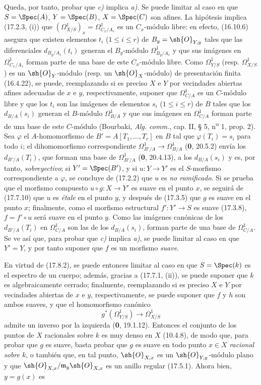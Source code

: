 Queda, por tanto, probar que \emph{c)} implica \emph{a)}. Se puede limitar al caso en que $S=\Spec(A)$, $Y=\Spec(B)$, $X=\Spec(C)$ son afines. La hipótesis implica (17.2.3, (i)) que $(\varOmega^1_{X/S})_x=\Omega^1_{C_x/A_s}$ es un $C_x$-módulo libre: en efecto, (16.10.6) asegura que existen elementos $t_i$ ($1\leq i\leq r$) de $B_y=\sh{O}_{Y,y}$ tales que las diferenciales $d_{B_y/A_s}(t_i)$ generan el $B_y$-módulo $\Omega^1_{B_y/A_s}$ y que sus imágenes en $\Omega^1_{C_x/A_s}$ forman parte de una base de este $C_x$-módulo libre. Como $\varOmega^1_{Y/S}$ (resp. $\varOmega^1_{X/S}$) es un $\sh{O}_Y$-módulo (resp. un $\sh{O}_X$-módulo) de presentación finita (16.4.22), se puede, reemplazando si es preciso $X$ e $Y$ por vecindades abiertas afines adecuadas de $x$ e $y$, respectivamente, suponer que $\Omega^1_{C/A}$ es un $C$-módulo libre y que los $t_i$ son las imágenes de elementos $s_i$ ($1\leq i\leq r$) de $B$ tales que los $d_{B/A}(s_i)$ generan el $B$-módulo $\Omega^1_{B/A}$ y que sus imágenes en $\Omega^1_{C/A}$ forman parte de una base de este $C$-módulo (Bourbaki, \emph{Alg. comm.}, cap. II, § 5, n\textsuperscript{o} 1, prop. 2). Sea $\varphi$ el $A$-homomorfismo de $B'=A[T_1,\ldots,T_r]$ en $B$ tal que $\varphi(T_i)=s_i$ para todo $i$; el dihomomorfismo correspondiente $\Omega^1_{B'/A}\to\Omega^1_{B/A}$ (\textbf 0, 20.5.2) envía los $d_{B'/A}(T_i)$, que forman una base de $\Omega^1_{B'/A}$ (\textbf 0, 20.4.13), a los $d_{B/A}(s_i)$ y es, por tanto, \emph{sobreyectivo}; si $Y'=\Spec(B')$, y si $u:Y\to Y'$ es el $S$-morfismo correspondiente a $\varphi$, se concluye de (17.2.2) que $u$ es \emph{no ramificado}. Si se prueba que el morfismo compuesto $u\circ g:X\to Y'$ es suave en el punto $x$, se seguirá de (17.7.10) que $u$ es \emph{étale} en el punto $y$, y después de (17.3.5) que $g$ es suave en el punto $x$; finalmente, como el morfismo estructural $f':Y'\to S$ es suave (17.3.8), $f=f'\circ u$ será suave en el punto $y$. Como las imágenes canónicas de los $d_{B'/A}(T_i)$ en $\Omega^1_{C/A}$ son las de los $d_{B/A}(s_i)$, forman parte de una base de $\Omega^1_{C/A}$. Se ve así que, para probar que \emph{c)} implica \emph{a)}, se puede limitar al caso en que $Y'=Y$, y por tanto suponer que $f$ es un morfismo \emph{suave}.

En virtud de (17.8.2), se puede entonces limitar al caso en que $S=\Spec(k)$ es el espectro de un cuerpo; además, gracias a (17.7.1, (ii)), se puede suponer que $k$ es algebraicamente cerrado; finalmente, reemplazando si es preciso $X$ e $Y$ por vecindades abiertas de $x$ e $y$, respectivamente, se puede suponer que $f$ y $h$ son ambos suaves, y que el homomorfismo canónico
\[
g^*(\varOmega^1_{Y/S})\to\varOmega^1_{X/S}
\]
admite un inverso por la izquierda (\textbf 0, 19.1.12). Entonces el conjunto de los puntos de $X$ racionales sobre $k$ es muy denso en $X$ (10.4.8), de modo que, para probar que $g$ es suave, basta probar que $g$ es suave en todo punto $x\in X$ \emph{racional sobre $k$}, o también que, en tal punto, $\sh{O}_{X,x}$ es un $\sh{O}_{Y,y}$-módulo plano y que $\sh{O}_{X,x}/\mathfrak m_y\sh{O}_{X,x}$ es un anillo regular (17.5.1). Ahora bien, $y=g(x)$ es

